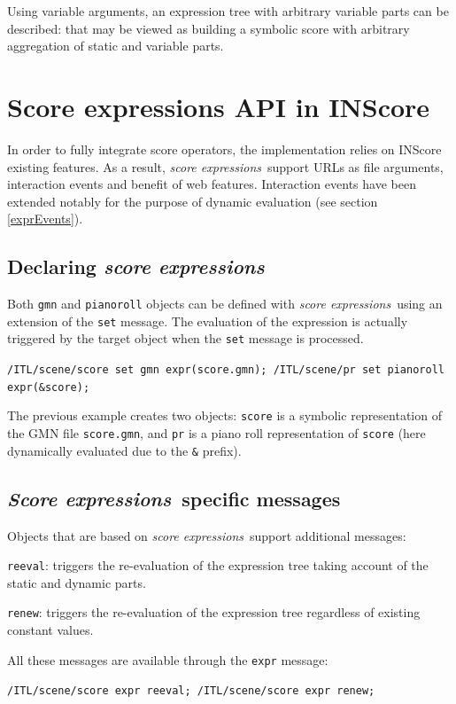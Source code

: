 \documentclass{article}
\newcommand{\OSC}[1]{{\fontsize{10pt}{10pt} \selectfont\texttt{#1}}}
\newcommand{\sExpr}{\emph{score expressions}}
\newcommand{\SExpr}{\emph{Score expressions}}
\let\olditemize\itemize
\let\oldenditemize\enditemize
\renewenvironment{itemize} 	{\olditemize \setlength{\itemsep}{1mm}}{\oldenditemize}
\newcommand{\sample}	[1]			{\vspace{-0.2em}\begin{center}\colorbox{mygrey}{\begin{minipage}[t]{0.95\columnwidth} {\small \texttt{#1}}\end{minipage}}\end{center}}
\begin{document}
Using variable arguments, an expression tree with arbitrary variable parts can be described: that may be viewed as building a symbolic score with arbitrary aggregation of static and variable parts.


\section{Score expressions API in INScore}
\label{exprAPI}
In order to fully integrate score operators, the implementation relies on INScore existing features. As a result, \sExpr\ support URLs as file arguments, interaction events and benefit of web features. Interaction events have been extended notably for the purpose of dynamic evaluation (see section \ref{exprEvents}).

\subsection{Declaring \sExpr}
\label{declaringExpr}
Both \OSC{gmn} and \OSC{pianoroll} objects can be defined with \sExpr\ using an extension of the \OSC{set} message. The evaluation of the expression is actually triggered by the target object when the \OSC{set} message is processed.

\sample{/ITL/scene/score set gmn expr(score.gmn);
/ITL/scene/pr set pianoroll expr(\&score);
}

The previous example creates two objects: \OSC{score} is a symbolic representation of the GMN file \OSC{score.gmn}, and \OSC{pr} is a piano roll representation of \OSC{score} (here dynamically evaluated due to the \OSC{\&} prefix).


\subsection{\SExpr\ specific messages}
\label{exprMsgs}
Objects that are based on \sExpr\ support additional messages:

\begin{itemize}
\item \OSC{reeval}: triggers the re-evaluation of the expression tree taking account of the static and dynamic parts.
\item \OSC{renew}: triggers the re-evaluation of the expression tree regardless of existing constant values. 
\end{itemize}

All these messages are available through the \OSC{expr} message:
\sample{/ITL/scene/score expr reeval;
/ITL/scene/score expr renew;
}
\end{document}
